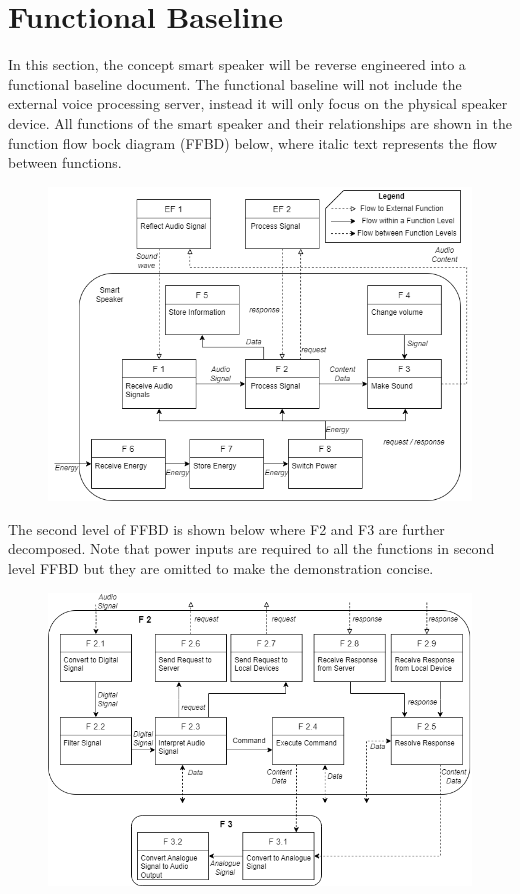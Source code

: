 \documentclass{article}
\begin{document}
\section{Functional Baseline}
In this section, the concept smart speaker will be reverse engineered into a functional baseline document. The functional baseline will not include the external voice processing server, instead it will only focus on the physical speaker device. All functions of the smart speaker and their relationships are shown in the function flow bock diagram (FFBD) below, where italic text represents the flow between functions.
\begin{figure}[H]
\centering
    \includegraphics[scale=0.5]{FFBD1}
\end{figure}
The second level of FFBD is shown below where F2 and F3 are further decomposed. Note that power inputs are required to all the functions in second level FFBD but they are omitted to make the demonstration concise.
\begin{figure}[H]
\centering
    \includegraphics[scale=0.5]{FFBD2}
\end{figure}
\end{document}
